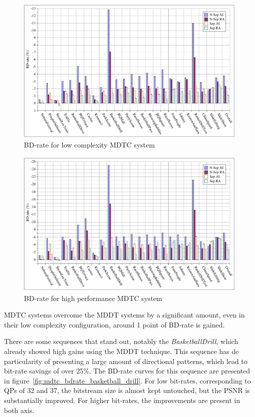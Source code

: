 \documentclass[11pt,a4paper,openright,twoside]{book}
\numberwithin{equation}{section} %
\numberwithin{figure}{section} %
\numberwithin{table}{section} %
\begin{document}
\begin{figure}[tb]
	\centering
	\includegraphics[width=1\linewidth]{./figures/mdtc_perf_simple.pdf}
	\caption{\acs{BD}-rate for low complexity \acs{MDTC} system}
	\label{fig:mdtc_perf_simple}
\end{figure}

\begin{figure}[tb]
	\centering
	\includegraphics[width=1\linewidth]{./figures/mdtc_perf_complex.pdf}
	\caption{\acs{BD}-rate for high performance \acs{MDTC} system}
	\label{fig:mdtc_perf_complex}
\end{figure}

\ac{MDTC} systems overcome the \ac{MDDT} systems by a significant amount,
even in their low complexity configuration, around 1 point of \ac{BD}-rate is
gained.

There are some sequences that stand out, notably the \emph{BasketballDrill},
which already showed high gains using the \ac{MDDT} technique.
This sequence has de particularity of presenting a large amount of directional
patterns, which lead to bit-rate savings of over 25\%.
The \ac{BD}-rate curves for this sequence are presented in
figure~\ref{fig:mdtc_bdrate_basketball_drill}.
For low bit-rates, corresponding to \acp{QP} of 32 and 37, the bitstream size
is almost kept untouched, but the \ac{PSNR} is substantially improved.
For higher bit-rates, the improvements are present in both axis.
\end{document}

